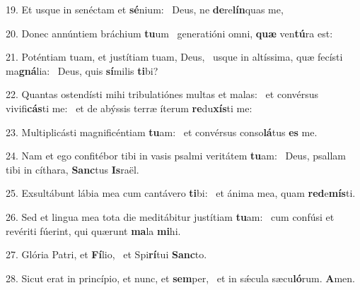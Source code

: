 19. Et usque in senéctam et \textbf{sé}nium: \ast\  Deus, ne \textbf{de}re\textbf{lín}quas me,\

20. Donec annúntiem bráchium \textbf{tu}um \ast\  generatióni omni, \textbf{quæ} ven\textbf{tú}ra est:\

21. Poténtiam tuam, et justítiam tuam, Deus, \dag\  usque in altíssima, quæ fecísti ma\textbf{gná}lia: \ast\  Deus, quis \textbf{sí}milis \textbf{ti}bi?\

22. Quantas ostendísti mihi tribulatiónes multas et malas: \dag\  et convérsus vivifi\textbf{cás}ti me: \ast\  et de abýssis terræ íterum \textbf{re}du\textbf{xís}ti me:\

23. Multiplicásti magnificéntiam \textbf{tu}am: \ast\  et convérsus conso\textbf{lá}tus \textbf{es} me.\

24. Nam et ego confitébor tibi in vasis psalmi veritátem \textbf{tu}am: \ast\  Deus, psallam tibi in cíthara, \textbf{Sanc}tus \textbf{Is}raël.\

25. Exsultábunt lábia mea cum cantávero \textbf{ti}bi: \ast\  et ánima mea, quam \textbf{red}e\textbf{mís}ti.\

26. Sed et lingua mea tota die meditábitur justítiam \textbf{tu}am: \ast\  cum confúsi et revériti fúerint, qui quærunt \textbf{ma}la \textbf{mi}hi.\

27. Glória Patri, et \textbf{Fí}lio, \ast\  et Spi\textbf{rí}tui \textbf{Sanc}to.\

28. Sicut erat in princípio, et nunc, et \textbf{sem}per, \ast\  et in sǽcula sæcu\textbf{ló}rum. \textbf{A}men.\

